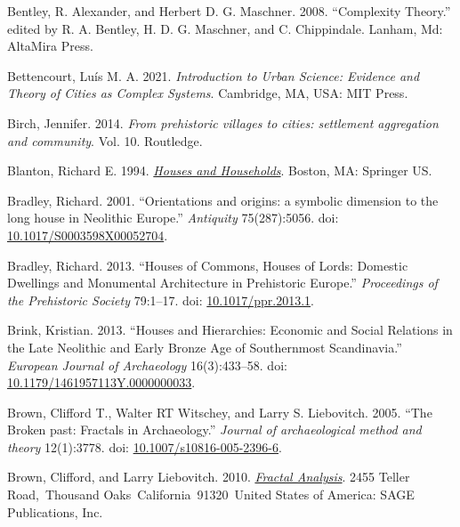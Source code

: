\documentclass[
  12pt,
]{book}
\newlength{\cslhangindent}
\newlength{\cslentryspacingunit} %
\newenvironment{CSLReferences}[2] %
 {%
  \setlength{\parindent}{0pt}
  \ifodd #1
  \let\oldpar\par
  \def\par{\hangindent=\cslhangindent\oldpar}
  \fi
  \setlength{\parskip}{#2\cslentryspacingunit}
 }%
 {}
\begin{document}
\begin{CSLReferences}{1}{0}
\leavevmode{}%
Bentley, R. Alexander, and Herbert D. G. Maschner. 2008. {``Complexity Theory.''} edited by R. A. Bentley, H. D. G. Maschner, and C. Chippindale. Lanham, Md: AltaMira Press.

\leavevmode{}%
Bettencourt, Luís M. A. 2021. \emph{Introduction to Urban Science: Evidence and Theory of Cities as Complex Systems}. Cambridge, MA, USA: MIT Press.

\leavevmode{}%
Birch, Jennifer. 2014. \emph{From prehistoric villages to cities: settlement aggregation and community}. Vol. 10. Routledge.

\leavevmode{}%
Blanton, Richard E. 1994. \emph{\href{https://doi.org/10.1007/978-1-4899-0990-9}{Houses and Households}}. Boston, MA: Springer US.

\leavevmode{}%
Bradley, Richard. 2001. {``Orientations and origins: a symbolic dimension to the long house in Neolithic Europe.''} \emph{Antiquity} 75(287):5056. doi: \href{https://doi.org/10.1017/S0003598X00052704}{10.1017/S0003598X00052704}.

\leavevmode{}%
Bradley, Richard. 2013. {``Houses of Commons, Houses of Lords: Domestic Dwellings and Monumental Architecture in Prehistoric Europe.''} \emph{Proceedings of the Prehistoric Society} 79:1--17. doi: \href{https://doi.org/10.1017/ppr.2013.1}{10.1017/ppr.2013.1}.

\leavevmode{}%
Brink, Kristian. 2013. {``Houses and Hierarchies: Economic and Social Relations in the Late Neolithic and Early Bronze Age of Southernmost Scandinavia.''} \emph{European Journal of Archaeology} 16(3):433--58. doi: \href{https://doi.org/10.1179/1461957113Y.0000000033}{10.1179/1461957113Y.0000000033}.

\leavevmode{}%
Brown, Clifford T., Walter RT Witschey, and Larry S. Liebovitch. 2005. {``The Broken past: Fractals in Archaeology.''} \emph{Journal of archaeological method and theory} 12(1):3778. doi: \href{https://doi.org/10.1007/s10816-005-2396-6}{10.1007/s10816-005-2396-6}.

\leavevmode{}%
Brown, Clifford, and Larry Liebovitch. 2010. \emph{\href{https://doi.org/10.4135/9781412993876}{Fractal Analysis}}. 2455 Teller Road,~Thousand Oaks~California~91320~United States of America: SAGE Publications, Inc.


\end{CSLReferences}
\end{document}
